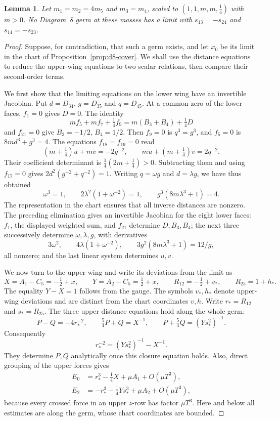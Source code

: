 \documentclass[11pt]{amsart}
\newtheorem{lemma}[theorem]{Lemma}
\theoremstyle{definition}
\theoremstyle{remark}
\begin{document}
{\begin{lemma}\label{lem:d8-cancel}
Let $m_1=m_2=4m_5$ and $m_3=m_4$, scaled to
$(1,1,m,m,\frac14)$ with $m>0$.
No Diagram~8 germ at these masses has a limit with
$s_{13}=-s_{24}$ and $s_{14}=-s_{23}$.
\end{lemma}

\begin{proof}
Suppose, for contradiction, that such a germ exists, and let $x_0$ be its limit in
the chart of Proposition~\ref{prop:d8-cover}.
We shall use the distance equations to reduce the upper-wing equations to
two scalar relations, then compare their second-order terms.

We first show that the limiting equations on the lower wing have an invertible
Jacobian.  Put $d=D_{34}$, $g=D_{35}$ and $q=D_{45}$.  At a common zero of the lower faces,
$f_1=0$ gives $D=0$. The identity
\[
m f_5+m f_7+\tfrac14 f_9=m(B_3+B_4)+\tfrac14D
\]
and $f_{21}=0$ give $B_3=-1/2$, $B_4=1/2$.
Then $f_9=0$ is $q^3=g^3$, and $f_5=0$ is $8md^3+g^3=4$.
The equations $f_{18}=f_{19}=0$ read
\[
(m+\tfrac14)u+mv=-2g^{-2},\qquad
mu+(m+\tfrac14)v=2q^{-2}.
\]
Their coefficient determinant is $\tfrac14(2m+\tfrac14)>0$.
Subtracting them and using $f_{17}=0$ gives
$2d^2(g^{-2}+q^{-2})=1$.
Writing $q=\omega g$ and $d=\lambda g$, we have thus obtained
\[
\omega^3=1,\qquad 2\lambda^2(1+\omega^{-2})=1,
\qquad g^3(8m\lambda^3+1)=4.
\]
The representation in the chart ensures that all inverse distances are nonzero.
The preceding elimination gives an invertible Jacobian for the eight lower faces:
$f_1$, the displayed weighted sum, and $f_{21}$ determine $D,B_3,B_4$;
the next three successively determine
$\omega,\lambda,g$, with derivatives
\[
3\omega^2,\qquad4\lambda(1+\omega^{-2}),\qquad
3g^2(8m\lambda^3+1)=12/g,
\]
all nonzero; and the last linear system determines $u,v$.

We now turn to the upper wing and write its deviations from the limit as
\[
X=A_1-C_5=-\tfrac12+x,\qquad
Y=A_2-C_5=\tfrac12+x,\qquad
R_{12}=-\tfrac12+v_*,\qquad R_{25}=1+h_*.
\]
The equality $Y-X=1$ follows from the gauge.  The symbols $v_*,h_*$
denote upper-wing deviations and are distinct from the chart coordinates $v,h$.
Write $r_*=R_{12}$ and $s_*=R_{25}$.
The three upper distance equations hold along the whole germ:
\[
P-Q=-4r_*^{-2},\qquad
\tfrac54 P+Q=X^{-1},\qquad
P+\tfrac54Q=(Ys_*^2)^{-1}.
\]
Consequently
\begin{equation}\label{eq:d8-upper-closure-analytic}
r_*^{-2}=(Ys_*^2)^{-1}-X^{-1}.
\end{equation}
They determine $P,Q$ analytically once this closure equation holds.
Also, direct grouping of the upper forces gives
\begin{align*}
E_0&=r_*^3-\tfrac14X+\mu A_1+O(\mu T^3),\\
E_2&=-r_*^3-\tfrac14Ys_*^3+\mu A_2+O(\mu T^3),
\end{align*}
because every crossed force in an upper $z$-row has factor $\mu T^3$.
Here and below all estimates are along the germ, whose chart coordinates
are bounded.


\end{proof}}
\end{document}
